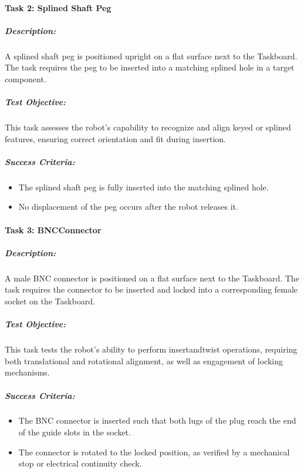 \documentclass[letterpaper,10pt,english]{sphinxmanual}
\begin{document}
\paragraph{Task 2: Splined Shaft Peg}
\label{\detokenize{robotic_instructions_peg_in_hole:task-2-splined-shaft-peg}}

\subparagraph{Description:}
\label{\detokenize{robotic_instructions_peg_in_hole:id1}}
\sphinxAtStartPar
A splined shaft peg is positioned upright on a flat surface next to the Taskboard.
The task requires the peg to be inserted into a matching splined hole in a target component.


\subparagraph{Test Objective:}
\label{\detokenize{robotic_instructions_peg_in_hole:id2}}
\sphinxAtStartPar
This task assesses the robot’s capability to recognize and align keyed or splined features, ensuring correct orientation and fit during insertion.


\subparagraph{Success Criteria:}
\label{\detokenize{robotic_instructions_peg_in_hole:id3}}\begin{itemize}
\item {} 
\sphinxAtStartPar
The splined shaft peg is fully inserted into the matching splined hole.

\item {} 
\sphinxAtStartPar
No displacement of the peg occurs after the robot releases it.

\end{itemize}


\paragraph{Task 3: BNC\sphinxhyphen{}Connector}
\label{\detokenize{robotic_instructions_peg_in_hole:task-3-bnc-connector}}

\subparagraph{Description:}
\label{\detokenize{robotic_instructions_peg_in_hole:id4}}
\sphinxAtStartPar
A male BNC connector is positioned on a flat surface next to the Taskboard.
The task requires the connector to be inserted and locked into a corresponding female socket on the Taskboard.


\subparagraph{Test Objective:}
\label{\detokenize{robotic_instructions_peg_in_hole:id5}}
\sphinxAtStartPar
This task tests the robot’s ability to perform insert\sphinxhyphen{}and\sphinxhyphen{}twist operations, requiring both translational and rotational alignment,
as well as engagement of locking mechanisms.


\subparagraph{Success Criteria:}
\label{\detokenize{robotic_instructions_peg_in_hole:id6}}\begin{itemize}
\item {} 
\sphinxAtStartPar
The BNC connector is inserted such that both lugs of the plug reach the end of the guide slots in the socket.

\item {} 
\sphinxAtStartPar
The connector is rotated to the locked position, as verified by a mechanical stop or electrical continuity check.

\end{itemize}
\end{document}
